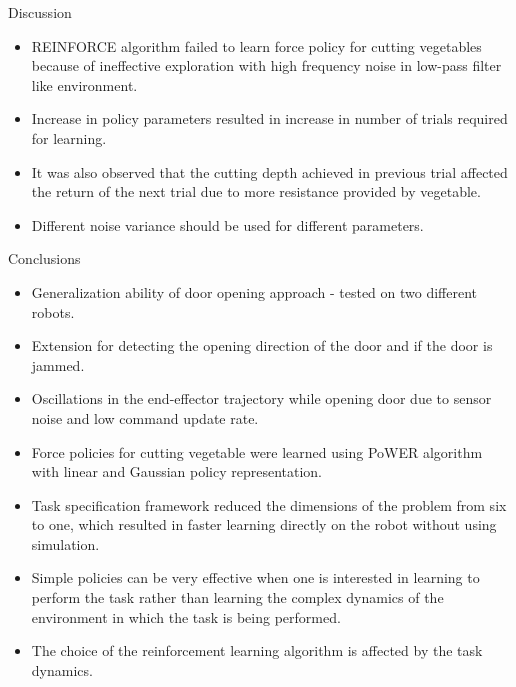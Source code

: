 \documentclass[aspectratio=169]{beamer}
\begin{document}
\begin{frame}{Discussion}
	\begin{itemize}
		\item REINFORCE algorithm failed to learn force policy for cutting vegetables because of ineffective exploration with high frequency noise in low-pass filter like environment.
		\item Increase in policy parameters resulted in increase in number of trials required for learning.
		\item It was also observed that the cutting depth achieved in previous trial affected the return of the next trial due to more resistance provided by vegetable.
		\item Different noise variance should be used for different parameters.
	\end{itemize}
\end{frame}




\begin{frame}{Conclusions}
	\vspace{-1cm}	

	\begin{minipage}[t]{0.49\textwidth}
		\begin{itemize}
			\small
			\item Generalization ability of door opening approach - tested on two different robots.
			\item Extension for detecting the opening direction of the door and if the door is jammed.
			\item Oscillations in the end-effector trajectory while opening door due to sensor noise and low command update rate.		
			\item Force policies for cutting vegetable were learned using PoWER algorithm with linear and Gaussian policy representation.
		\end{itemize}
	\end{minipage}
	\hfill
	\begin{minipage}[t]{0.49\textwidth}
		\begin{itemize}
			\small
	
			\item Task specification framework reduced the dimensions of the problem from six to one, which resulted in faster learning directly on the robot without using simulation.
			\item Simple policies can be very effective when one is interested in learning to perform the task rather than learning the complex dynamics of the environment in which the task is being performed.
			\item The choice of the reinforcement learning algorithm is affected by the task dynamics.
			
		\end{itemize}
	\end{minipage}
\end{frame}
\end{document}
